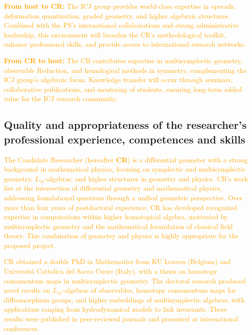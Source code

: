 \documentclass[11pt,draftproposal]{msca-pf}
\begin{document}
\textbf{\textcolor{orange}{From host to CR:}}  
\textcolor{orange}{The ICJ group provides world-class expertise in operads, deformation quantization, graded geometry, and higher algebraic structures. Combined with the PS’s international collaborations and strong administrative leadership, this environment will broaden the CR’s methodological toolkit, enhance professional skills, and provide access to international research networks.}  

\textbf{\textcolor{orange}{From CR to host:}}  
\textcolor{orange}{The CR contributes expertise in multisymplectic geometry, observable Reduction, and homological methods in symmetry, complementing the ICJ group’s algebraic focus. Knowledge transfer will occur through seminars, collaborative publications, and mentoring of students, ensuring long-term added value for the ICJ research community.}






\subsection{Quality and appropriateness of the researcher's professional
    experience, competences and skills}
\label{ssc:excellence: researcher}

\textcolor{orange}{The Candidate Researcher (hereafter \textbf{CR}) is a differential geometer with a strong background in mathematical physics, focusing on symplectic and multisymplectic geometry, $L_\infty$-algebras, and higher structures in geometry and physics. CR’s work lies at the intersection of differential geometry and mathematical physics, addressing foundational questions through a unified geometric perspective. Over more than four years of postdoctoral experience, CR has developed recognized expertise in computations within higher homotopical algebra, motivated by multisymplectic geometry and the mathematical formulation of classical field theory. This combination of geometry and physics is highly appropriate for the proposed project.}  

\textcolor{orange}{CR obtained a double PhD in Mathematics from KU Leuven (Belgium) and Università Cattolica del Sacro Cuore (Italy), with a thesis on homotopy comomentum maps in multisymplectic geometry. The doctoral research produced novel results on $L_\infty$-algebras of observables, homotopy comomentum maps for diffeomorphism groups, and higher embeddings of multisymplectic algebras, with applications ranging from hydrodynamical models to link invariants. These results were published in peer-reviewed journals and presented at international conferences.}  
\end{document}
